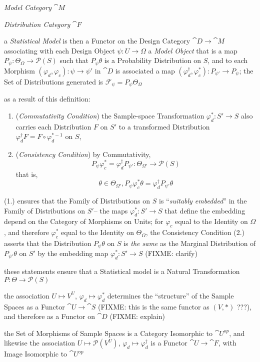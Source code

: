 \emph{Model Category} $\cat{M}$

\emph{Distribution Category} $\cat{F}$

a \emph{Statistical Model} is then a Functor on the Design Category
$\cat{D} \to \cat{M}$ associating with each Design Object $\psi : U \to \Omega$
a \emph{Model Object} that is a map $P_\psi : \Theta_\Omega \to \mathcal{P}(S)$
such that $P_\psi\theta$ is a Probability Distribution on $S$, and to each
Morphism $(\varphi_d,\varphi_c) : \psi \to \psi'$ in $\cat{D}$ is associated a
map $(\varphi_d^\dagger, \varphi_c^*) : P_{\psi'} \to P_\psi$; the Set of
Distributions generated is $\mathcal{F}_\psi = P_\psi \Theta_\Omega$

as a result of this definition:
\begin{enumerate}
  \item (\emph{Commutativity Condition}) the Sample-space Transformation
    $\varphi_d^* : S' \to S$ also carries each Distribution $F$ on $S'$ to a
    transformed Distribution $\varphi_d^\dagger F = F \circ \varphi^{*-1}_d$ on
    $S$,
  \item (\emph{Consistency Condition}) by Commutativity,
    \[
      P_\psi\varphi_c^* =
        \varphi_d^\dagger P_{\psi'} : \Theta_{\Omega'} \to \mathcal{P}(S)
    \]
    that is,
    \[
      \theta \in \Theta_{\Omega'}, P_\psi \varphi_c^* \theta =
        \varphi_d^\dagger P_{\psi'} \theta
    \]
\end{enumerate}
(1.) ensures that the Family of Distributions on $S$ is ``\emph{suitably
embedded}'' in the Family of Distributions on $S'$-- the maps
$\varphi_d^* : S' \to S$ that define the embedding depend on the Category of
Morphisms on Units; for $\varphi_c$ equal to the Identity on $\Omega$, and
therefore $\varphi_c^*$ equal to the Identity on $\Theta_\Omega$, the
Consistency Condition (2.) asserts that the Distribution $P_\psi\theta$ on
$S$ is \emph{the same} as the Marginal Distribution of $P_{\psi'}\theta$ on $S'$
by the embedding map $\varphi_d^* : S' \to S$ (FIXME: clarify)

these statements ensure that a Statistical model is a Natural Transformation
$P : \Theta \to \mathcal{P}(S)$

the association $U \mapsto V^U$, $\varphi_d \mapsto \varphi_d^*$ determines the
``structure'' of the Sample Spaces as a Functor $\cat{U} \to \cat{S}$ (FIXME:
this is the same functor as $(V, *)$ ???), and therefore as a Functor on
$\cat{D}$ (FIXME: explain)

the Set of Morphisms of Sample Spaces is a Category Isomorphic to
$\cat{U}^{op}$, and likewise the association $U \mapsto \mathcal{P}(V^U)$,
$\varphi_d \mapsto \varphi_d^\dagger$ is a Functor $\cat{U} \to \cat{F}$,
with Image Isomorphic to $\cat{U}^{op}$

